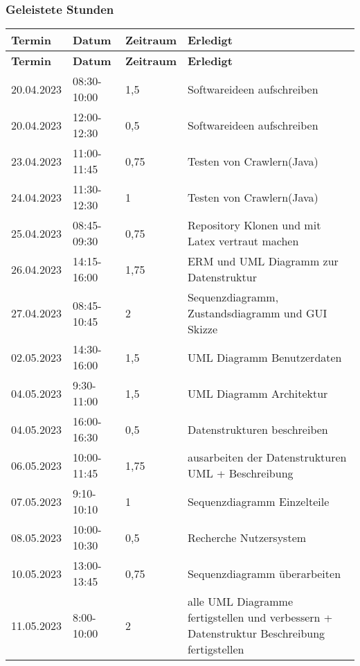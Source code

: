 \subsubsection{Geleistete Stunden}
\begin{flushleft}
		\begin{longtable}{p{2cm}p{}p{2cm}p{}}
            \toprule
            \textbf{Termin} & \textbf{Datum} & \textbf{Zeitraum} & \textbf{Erledigt}\\
            \midrule\endfirsthead
            \toprule
            \textbf{Termin} & \textbf{Datum} & \textbf{Zeitraum} & \textbf{Erledigt}\\
            \midrule\endhead
            	20.04.2023 & 08:30-10:00 & 1,5 & Softwareideen aufschreiben\\ \midrule
    			20.04.2023 & 12:00-12:30 & 0,5 & Softwareideen aufschreiben\\ \midrule
    			23.04.2023 & 11:00-11:45 & 0,75 & Testen von Crawlern(Java)\\ \midrule
    			24.04.2023 & 11:30-12:30 & 1 & Testen von Crawlern(Java)\\ \midrule
    			25.04.2023 & 08:45-09:30 & 0,75 & Repository Klonen und mit Latex vertraut machen\\ \midrule
    			26.04.2023 & 14:15-16:00 & 1,75 & ERM und UML Diagramm zur Datenstruktur\\ \midrule
    			27.04.2023 & 08:45-10:45 & 2 & Sequenzdiagramm, Zustandsdiagramm und GUI Skizze\\
    			02.05.2023 & 14:30-16:00 & 1,5 & UML Diagramm Benutzerdaten\\ \midrule
    			04.05.2023 & 9:30-11:00 & 1,5 & UML Diagramm Architektur\\ \midrule
    			04.05.2023 & 16:00-16:30& 0,5 & Datenstrukturen beschreiben\\ \midrule
    			06.05.2023 & 10:00-11:45 & 1,75 & ausarbeiten der Datenstrukturen UML + Beschreibung \\ \midrule
    			07.05.2023 & 9:10-10:10 & 1 & Sequenzdiagramm Einzelteile\\ \midrule
    			08.05.2023 & 10:00-10:30 & 0,5 & Recherche Nutzersystem\\ \midrule
    			10.05.2023 & 13:00-13:45 & 0,75 & Sequenzdiagramm überarbeiten\\ \midrule
    			11.05.2023 & 8:00-10:00 & 2 & alle UML Diagramme fertigstellen und verbessern + Datenstruktur Beschreibung fertigstellen\\ 

            \bottomrule
    \end{longtable}
\end{flushleft}